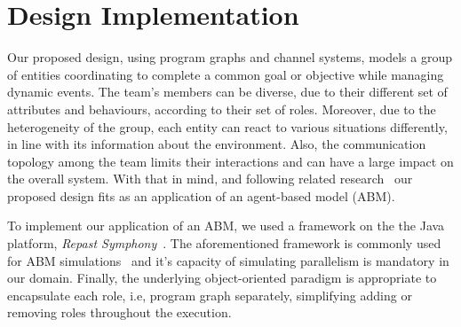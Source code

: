 \section{Design Implementation}
\label{sec:design}

Our proposed design, using program graphs and channel systems, models a group of entities coordinating to complete a common goal or objective while managing dynamic events. The team's members can be diverse, due to their different set of attributes and behaviours, according to their set of roles. Moreover, due to the heterogeneity of the group, each entity can react to various situations differently, in line with its information about the environment. Also, the communication topology among the team limits their interactions and can have a large impact on the overall system. With that in mind, and following related research~\cite{evaluating} our proposed design fits as an application of an agent-based model (ABM). 

To implement our application of an ABM, we used a framework on the the Java platform, \textit{Repast Symphony}~\cite{repastDoc}. The aforementioned framework is commonly used for ABM simulations~\cite{repast} and it's capacity of simulating parallelism is mandatory in our domain. Finally, the underlying object-oriented paradigm is appropriate to encapsulate each role, i.e, program graph separately, simplifying adding or removing roles throughout the execution.







